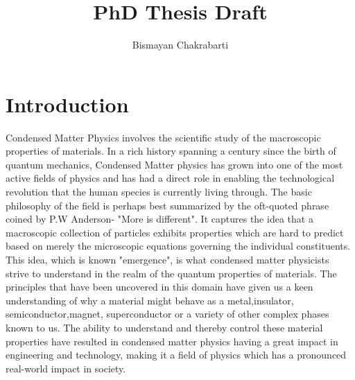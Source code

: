 \documentclass[12pt,letter]{article}
\begin{document}
\selectfont
\title{PhD Thesis Draft}
\date{}
\author{Bismayan Chakrabarti}
\maketitle
\pagebreak

\tableofcontents

\pagebreak

\section{Introduction}

Condensed Matter Physics involves the scientific study of the macroscopic properties of materials. In a rich history spanning a century since the birth of quantum mechanics, Condensed Matter physics has grown into one of the most active fields of physics and has had a direct role in enabling the technological revolution that the human species is currently living through. The basic philosophy of the field is perhaps best summarized by the oft-quoted phrase coined by P.W Anderson- "More is different". It captures the idea that a macroscopic collection of particles exhibits properties which are hard to predict based on merely the microscopic equations governing the individual constituents. This idea, which is known "emergence", is what condensed matter physicists strive to understand in the realm of the quantum properties of materials. The principles that have been uncovered in this domain have given us a keen understanding of why a material might behave as a metal,insulator, semiconductor,magnet, superconductor or a variety of other complex phases known to us. The ability to understand and thereby control these material properties have resulted in condensed matter physics having a great impact in engineering and technology, making it a field of physics which has a pronounced real-world impact in society.
\linebreak
\end{document}
